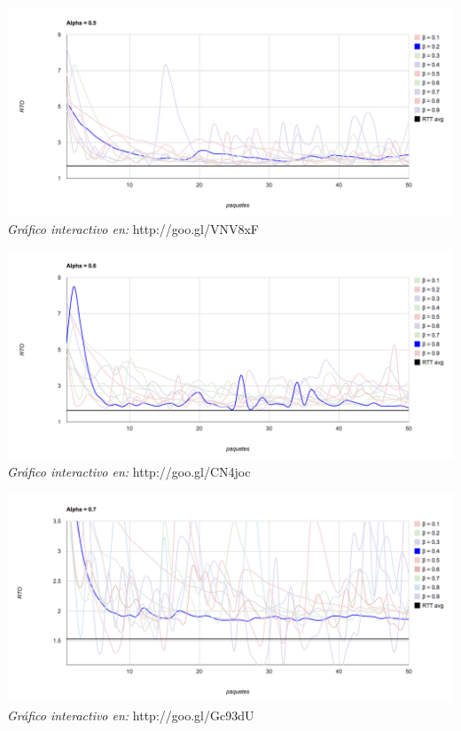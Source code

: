 \begin{center}
	\includegraphics[scale=0.35]{graphics/rto_vs_paquetes_a_5.png}
	\textit{Gráfico interactivo en:} http://goo.gl/VNV8xF
\end{center}

\begin{center}
	\includegraphics[scale=0.35]{graphics/rto_vs_paquetes_a_6.png}
	\textit{Gráfico interactivo en:} http://goo.gl/CN4joc
\end{center}

\begin{center}
	\includegraphics[scale=0.35]{graphics/rto_vs_paquetes_a_7.png}
	\textit{Gráfico interactivo en:} http://goo.gl/Gc93dU
\end{center}

